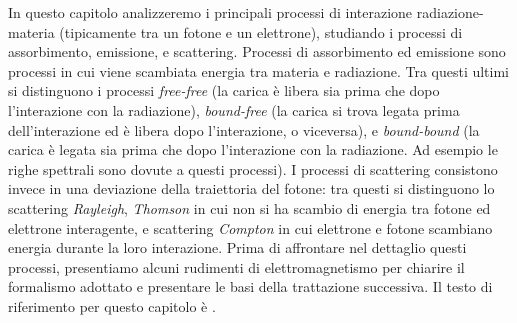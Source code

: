 In questo capitolo analizzeremo i principali processi di interazione radiazione-materia (tipicamente tra un fotone e un elettrone), studiando i processi di assorbimento, emissione, e scattering. Processi di assorbimento ed emissione sono processi in cui viene scambiata energia tra materia e radiazione. Tra questi ultimi si distinguono i processi \textit{free-free} (la carica è libera sia prima che dopo l'interazione con la radiazione), \textit{bound-free} (la carica si trova legata prima dell'interazione ed è libera dopo l'interazione, o viceversa), e \textit{bound-bound} (la carica è legata sia prima che dopo l'interazione con la radiazione. Ad esempio le righe spettrali sono dovute a questi processi). I processi di scattering consistono invece in una deviazione della traiettoria del fotone: tra questi si distinguono lo scattering \textit{Rayleigh}, \textit{Thomson} in cui non si ha scambio di energia tra fotone ed elettrone interagente, e scattering \textit{Compton} in cui elettrone e fotone scambiano energia durante la loro interazione. Prima di affrontare nel dettaglio questi processi, presentiamo alcuni rudimenti di elettromagnetismo per chiarire il formalismo adottato e presentare le basi della trattazione successiva. Il testo di riferimento per questo capitolo è \citep{book:Rybicki}.



